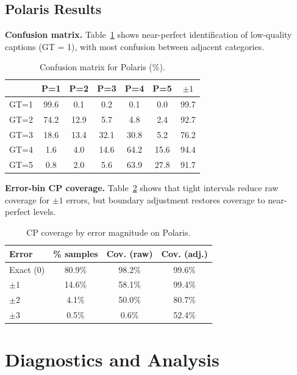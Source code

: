 \documentclass{article}
\begin{document}
\subsection{Polaris Results}
\label{app:polaris_core}

\textbf{Confusion matrix.}
Table~\ref{tab:polaris_confusion} shows near-perfect identification of low-quality captions (GT = 1), with most confusion between adjacent categories.

\begin{table}[t]
\centering
\caption{Confusion matrix for Polaris (\%).}
\label{tab:polaris_confusion}
\small
\begin{tabular}{l|ccccc|c}
\toprule
& \textbf{P=1} & \textbf{P=2} & \textbf{P=3} & \textbf{P=4} & \textbf{P=5} & $\pm 1$ \\
\midrule
GT=1 & 99.6 & 0.1 & 0.2 & 0.1 & 0.0 & 99.7 \\
GT=2 & 74.2 & 12.9 & 5.7 & 4.8 & 2.4 & 92.7 \\
GT=3 & 18.6 & 13.4 & 32.1 & 30.8 & 5.2 & 76.2 \\
GT=4 & 1.6 & 4.0 & 14.6 & 64.2 & 15.6 & 94.4 \\
GT=5 & 0.8 & 2.0 & 5.6 & 63.9 & 27.8 & 91.7 \\
\bottomrule
\end{tabular}
\end{table}

\textbf{Error-bin CP coverage.}
Table~\ref{tab:polaris_error_bins} shows that tight intervals reduce raw coverage for $\pm 1$ errors, but boundary adjustment restores coverage to near-perfect levels.

\begin{table}[t]
\centering
\caption{CP coverage by error magnitude on Polaris.}
\label{tab:polaris_error_bins}
\small
\begin{tabular}{lccc}
\toprule
\textbf{Error} & \textbf{\% samples} & \textbf{Cov. (raw)} & \textbf{Cov. (adj.)} \\
\midrule
Exact (0) & 80.9\% & 98.2\% & 99.6\% \\
$\pm 1$ & 14.6\% & 58.1\% & 99.4\% \\
$\pm 2$ & 4.1\% & 50.0\% & 80.7\% \\
$\pm 3$ & 0.5\% & 0.6\% & 52.4\% \\
\bottomrule
\end{tabular}
\end{table}

\section{Diagnostics and Analysis}
\end{document}
